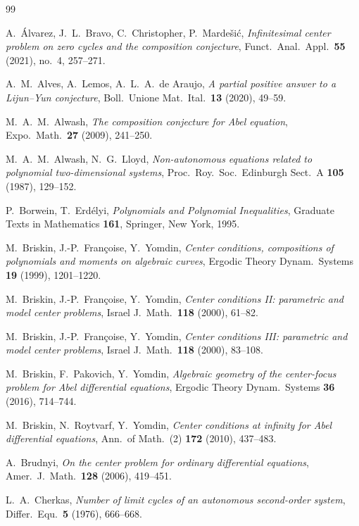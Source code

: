 \documentclass[11pt]{amsart}
\numberwithin{equation}{section}
\theoremstyle{plain}
\theoremstyle{definition}
\theoremstyle{remark}
\begin{document}
\begin{thebibliography}{99}

A.~\'Alvarez, J.~L.~Bravo, C.~Christopher, P.~Marde\v{s}i\'c,
\emph{Infinitesimal center problem on zero cycles and the composition conjecture},
Funct.\ Anal.\ Appl.\ \textbf{55} (2021), no.~4, 257--271.

A.~M.~Alves, A.~Lemos, A.~L.~A.~de Araujo,
\emph{A partial positive answer to a Lijun--Yun conjecture},
Boll.\ Unione Mat.\ Ital.\ \textbf{13} (2020), 49--59.

M.~A.~M.~Alwash,
\emph{The composition conjecture for Abel equation},
Expo.\ Math.\ \textbf{27} (2009), 241--250.

M.~A.~M.~Alwash, N.~G.~Lloyd,
\emph{Non-autonomous equations related to polynomial two-dimensional systems},
Proc.\ Roy.\ Soc.\ Edinburgh Sect.\ A \textbf{105} (1987), 129--152.

P.~Borwein, T.~Erd\'elyi,
\emph{Polynomials and Polynomial Inequalities},
Graduate Texts in Mathematics \textbf{161}, Springer, New York, 1995.

M.~Briskin, J.-P.~Fran\c{c}oise, Y.~Yomdin,
\emph{Center conditions, compositions of polynomials and moments on algebraic curves},
Ergodic Theory Dynam.\ Systems \textbf{19} (1999), 1201--1220.

M.~Briskin, J.-P.~Fran\c{c}oise, Y.~Yomdin,
\emph{Center conditions II: parametric and model center problems},
Israel J.\ Math.\ \textbf{118} (2000), 61--82.

M.~Briskin, J.-P.~Fran\c{c}oise, Y.~Yomdin,
\emph{Center conditions III: parametric and model center problems},
Israel J.\ Math.\ \textbf{118} (2000), 83--108.

M.~Briskin, F.~Pakovich, Y.~Yomdin,
\emph{Algebraic geometry of the center-focus problem for Abel differential equations},
Ergodic Theory Dynam.\ Systems \textbf{36} (2016), 714--744.

M.~Briskin, N.~Roytvarf, Y.~Yomdin,
\emph{Center conditions at infinity for Abel differential equations},
Ann.\ of Math.\ (2) \textbf{172} (2010), 437--483.

A.~Brudnyi,
\emph{On the center problem for ordinary differential equations},
Amer.\ J.\ Math.\ \textbf{128} (2006), 419--451.

L.~A.~Cherkas,
\emph{Number of limit cycles of an autonomous second-order system},
Differ.\ Equ.\ \textbf{5} (1976), 666--668.


\end{thebibliography}
\end{document}
